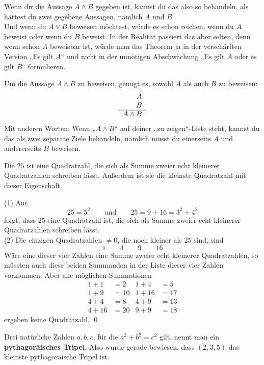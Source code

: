 \begin{bem}
 Wenn dir die Aussage $A\land B$ gegeben ist, kannst du das also so behandeln, als hättest du zwei gegebene Aussagen, nämlich $A$ und $B$. \\
 Und wenn du $A\lor B$ beweisen möchtest, würde es schon reichen, wenn du $A$ beweist oder wenn du $B$ beweist. In der Realität passiert das aber selten, denn wenn schon $A$ beweisbar ist, würde man das Theorem ja in der verschärften Version „Es gilt $A$“ und nicht in der unnötigen Abschwächung „Es gilt $A$ oder es gilt $B$“ formulieren.
\end{bem}


\begin{axi} \label{undbeweise}
Um die Aussage $A\land B$ zu beweisen, genügt es, sowohl $A$ als auch $B$ zu beweisen:
\[ \begin{tabular}{r}
    $A$ \\
    $B$ \\
    \hline 
    $A\land B$
   \end{tabular} \]
Mit anderen Worten: Wenn „$A\land B$“ auf deiner „zu zeigen“-Liste steht, kannst du das als zwei separate Ziele behandeln, nämlich musst du einerseits $A$ und andererseits $B$ beweisen.
\end{axi}



\begin{bsp}
   Die $25$ ist eine Quadratzahl, die sich als Summe zweier echt kleinerer Quadratzahlen schreiben lässt. Außerdem ist sie die kleinste Quadratzahl mit dieser Eigenschaft.
   \end{bsp}
   \begin{bew}
    (1) Aus
   \[ 25=5^2 \qquad\text{und}\qquad 25 = 9 + 16 = 3^2 + 4^2 \]
folgt, dass $25$ eine Quadratzahl ist, die sich als Summe zweier echt kleinerer Quadratzahlen schreiben lässt. \\
   (2) Die einzigen Quadratzahlen $\neq 0$, die noch kleiner als $25$ sind, sind
   \[ 1\qquad 4\qquad 9\qquad 16 \]
  Wäre eine dieser vier Zahlen eine Summe zweier echt kleinerer Quadratzahlen, so müssten auch diese beiden Summanden in der Liste dieser vier Zahlen vorkommen. Aber alle möglichen Summationen
  \begin{align*}
1+1 & = 2 & 1+4 & = 5 \\
1+ 9 & = 10 & 1+16 & = 17 \\
4 + 4 & = 8 & 4+9 & = 13 \\
 4+16 & = 20 & 9+9 & = 18
  \end{align*}
  ergeben keine Quadratzahl. \qed
   \end{bew}
\begin{bem}


 Drei natürliche Zahlen $a,b,c$, für die $a^2+b^2=c^2$ gilt, nennt man ein \textbf{pythagoräisches Tripel}. Also wurde gerade bewiesen, dass $(2,3,5)$ das kleinste pythagoräische Tripel ist.
\end{bem}



